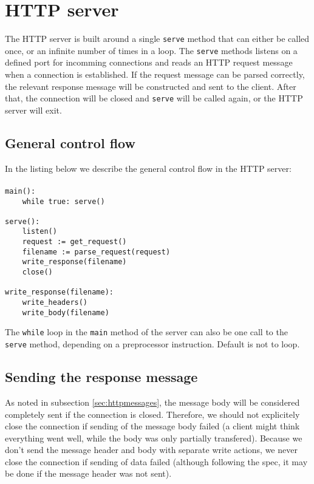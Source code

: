 \documentclass[11pt]{article}
\begin{document}
\section{HTTP server}

The HTTP server is built around a single \lstinline|serve| method that can either
be called once, or an infinite number of times in a loop. The \lstinline|serve|
methods listens on a defined port for incomming connections and reads an HTTP
request message when a connection is established. If the request message can
be parsed correctly, the relevant response message will be constructed and
sent to the client. After that, the connection will be closed and \lstinline|serve|
will be called again, or the HTTP server will exit.


\subsection{General control flow}

In the listing below we describe the general control flow in the HTTP server:

\paragraph{}

\begin{lstlisting}[title=HTTP client control flow]
main():
    while true: serve()

serve():
    listen()
    request := get_request()
    filename := parse_request(request)
    write_response(filename)
    close()

write_response(filename):
    write_headers()
    write_body(filename)
\end{lstlisting}

The \lstinline|while| loop in the \lstinline|main| method of the server can
also be one call to the \lstinline|serve| method, depending on a preprocessor
instruction. Default is not to loop.


\subsection{Sending the response message}

As noted in subsection \ref{sec:httpmessages}, the message body will be
considered completely sent if the connection is closed. Therefore, we should
not explicitely close the connection if sending of the message body
failed (a client might think everything went well, while the body was only
partially transfered). Because we don't send the message header and body with
separate write actions, we never close the connection if sending of data
failed (although following the spec, it may be done if the message header was
not sent).
\end{document}
